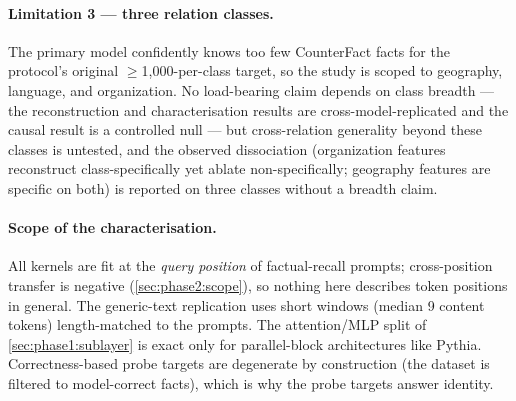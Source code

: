 \paragraph{Limitation 3 --- three relation classes.}
The primary model confidently knows too few CounterFact facts for the
protocol's original $\ge$1{,}000-per-class target, so the study is scoped to
geography, language, and organization. No load-bearing claim depends on class
breadth --- the reconstruction and characterisation results are
cross-model-replicated and the causal result is a controlled null --- but
cross-relation generality beyond these classes is untested, and the observed
dissociation (organization features reconstruct class-specifically yet ablate
non-specifically; geography features are specific on both) is reported on
three classes without a breadth claim.

\paragraph{Scope of the characterisation.}
All kernels are fit at the \emph{query position} of factual-recall prompts;
cross-position transfer is negative (\cref{sec:phase2:scope}), so nothing
here describes token positions in general. The generic-text replication uses
short windows (median 9 content tokens) length-matched to the prompts. The
attention/MLP split of \cref{sec:phase1:sublayer} is exact only for
parallel-block architectures like Pythia. Correctness-based probe targets are
degenerate by construction (the dataset is filtered to model-correct facts),
which is why the probe targets answer identity.

